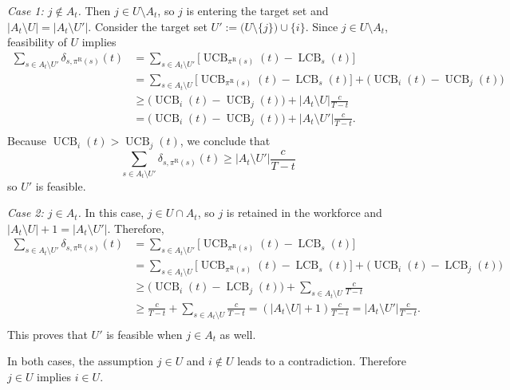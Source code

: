 \documentclass[opre,blindrev]{informs3}
\newcommand{\UCB}{\operatorname{UCB}}
\newcommand{\LCB}{\operatorname{LCB}}
\begin{document}
\begin{APPENDICES}
    \textit{Case 1: \(j\notin A_t\).}
    Then \(j\in U\setminus A_t\), so \(j\) is entering the target set and \(|A_t\setminus U|=|A_t\setminus U'|\). Consider the target set \( U' := \bigl(U\setminus\{j\}\bigr)\cup\{i\}. \)
    Since \(j\in U\setminus A_t\), feasibility of \(U\) implies
    \begin{align*}
        \sum_{s\in A_t\setminus U'} \delta_{s,\pi^{\mathrm R}(s)}(t)&=\sum_{s\in A_t\setminus U'}\bigg[\UCB_{\pi^{\mathrm R}(s)}(t)-\LCB_s(t)\bigg]\\
        &=\sum_{s\in A_t\setminus U}\bigg[\UCB_{\pi^{\mathrm R}(s)}(t)-\LCB_s(t)\bigg]+ \bigg(\UCB_i(t)-\UCB_j(t)\bigg)\\
        &\ge \bigg(\UCB_i(t)-\UCB_j(t)\bigg)+|A_t\setminus U|\frac{c}{T-t}\\
        &=\bigg(\UCB_i(t)-\UCB_j(t)\bigg)+|A_t\setminus U'|\frac{c}{T-t}.\\
    \end{align*}
    Because \(\UCB_i(t)>\UCB_j(t)\), we conclude that 
    \[\sum_{s\in A_t\setminus U'} \delta_{s,\pi^{\mathrm R}(s)}(t)\ge |A_t\setminus U'|\frac{c}{T-t}\]
    so \(U'\) is feasible. 
    
    \textit{Case 2: \(j\in A_t\).}
    In this case, \(j\in U\cap A_t\), so \(j\) is retained in the workforce and \(|A_t\setminus U|+1=|A_t\setminus U'|\). Therefore,
    \begin{align*}
        \sum_{s\in A_t\setminus U'} \delta_{s,\pi^{\mathrm R}(s)}(t)&=\sum_{s\in A_t\setminus U'}\bigg[\UCB_{\pi^{\mathrm R}(s)}(t)-\LCB_s(t)\bigg]\\
        &=\sum_{s\in A_t\setminus U}\bigg[\UCB_{\pi^{\mathrm R}(s)}(t)-\LCB_s(t)\bigg]+ \bigg(\UCB_i(t)-\LCB_j(t)\bigg)\\
        &\ge \bigg(\UCB_i(t)-\LCB_j(t)\bigg)+\sum_{s\in A_t\setminus U}\frac{c}{T-t}\\
        &\ge \frac{c}{T-t}+\sum_{s\in A_t\setminus U}\frac{c}{T-t}=(|A_t\setminus U|+1)\frac{c}{T-t}=|A_t\setminus U'|\frac{c}{T-t}.\\
    \end{align*}
    This proves that \(U'\) is feasible when \(j\in A_t\) as well.
    
    In both cases, the assumption \(j\in U\) and \(i\notin U\) leads to a contradiction. Therefore \(j\in U\) implies \(i\in U\).\Halmos 


\end{APPENDICES}
\end{document}
